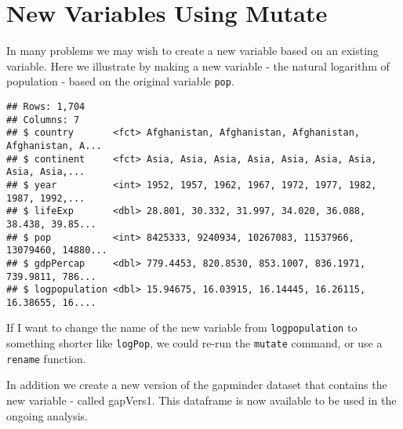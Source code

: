 \documentclass[
]{book}
\newenvironment{Shaded}{\begin{snugshade}}{\end{snugshade}}
\newcommand{\CommentTok}[1]{\textcolor[rgb]{0.56,0.35,0.01}{\textit{#1}}}
\newcommand{\DataTypeTok}[1]{\textcolor[rgb]{0.13,0.29,0.53}{#1}}
\newcommand{\KeywordTok}[1]{\textcolor[rgb]{0.13,0.29,0.53}{\textbf{#1}}}
\newcommand{\NormalTok}[1]{#1}
\newcommand{\OperatorTok}[1]{\textcolor[rgb]{0.81,0.36,0.00}{\textbf{#1}}}
\newcommand{\StringTok}[1]{\textcolor[rgb]{0.31,0.60,0.02}{#1}}
\begin{document}
\hypertarget{new-variables-using-mutate}{%
\section{New Variables Using Mutate}\label{new-variables-using-mutate}}

In many problems we may wish to create a new variable based on an existing variable. Here we illustrate by making a new variable - the natural logarithm of population - based on the original variable \texttt{pop}.

\begin{Shaded}
\end{Shaded}

\begin{verbatim}
## Rows: 1,704
## Columns: 7
## $ country       <fct> Afghanistan, Afghanistan, Afghanistan, Afghanistan, A...
## $ continent     <fct> Asia, Asia, Asia, Asia, Asia, Asia, Asia, Asia, Asia,...
## $ year          <int> 1952, 1957, 1962, 1967, 1972, 1977, 1982, 1987, 1992,...
## $ lifeExp       <dbl> 28.801, 30.332, 31.997, 34.020, 36.088, 38.438, 39.85...
## $ pop           <int> 8425333, 9240934, 10267083, 11537966, 13079460, 14880...
## $ gdpPercap     <dbl> 779.4453, 820.8530, 853.1007, 836.1971, 739.9811, 786...
## $ logpopulation <dbl> 15.94675, 16.03915, 16.14445, 16.26115, 16.38655, 16....
\end{verbatim}

If I want to change the name of the new variable from \texttt{logpopulation} to something shorter like \texttt{logPop}, we could re-run the \texttt{mutate} command, or use a \texttt{rename} function.

In addition we create a new version of the gapminder dataset that contains the new variable - called gapVers1. This dataframe is now available to be used in
the ongoing analysis.

\begin{Shaded}
\end{Shaded}
\end{document}
